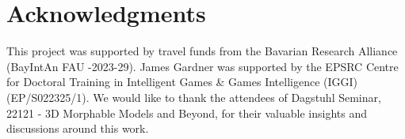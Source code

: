 \documentclass[10pt,journal,compsoc,twoside]{IEEEtran}
\begin{document}
\IEEEpeerreviewmaketitle
\maketitle









\section*{Acknowledgments}
This project was supported by travel funds from the Bavarian Research Alliance (BayIntAn  FAU -2023-29). James Gardner was supported by the EPSRC Centre for Doctoral Training in Intelligent Games \& Games Intelligence (IGGI) (EP/S022325/1). We would like to thank the attendees of Dagstuhl Seminar, 22121 - 3D Morphable Models and Beyond, for their valuable insights and discussions around this work.




\end{document}
